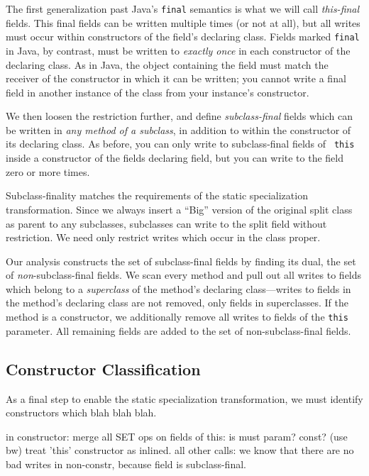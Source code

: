 \documentclass{acmconf}
\begin{document}
The first generalization past Java's {\tt final} semantics is what we
will call {\it this-final} fields.  This final fields can be written
multiple times (or not at all), but all writes must occur within
constructors of the field's declaring class.
Fields marked {\tt final} in Java, by
contrast, must be written to {\it exactly once} in each constructor of
the declaring class.
As in Java, the object containing the field must match the receiver of
the constructor in which it can be written; you cannot write a final
field in another instance of the class from your instance's
constructor.

We then loosen the restriction further, and define
{\it subclass-final} fields which can be written in {\it any method of
  a subclass}, in addition to within the constructor of its declaring
class.  As before, you can only write to subclass-final fields of {\tt
  this} inside a constructor of the fields declaring field, but you
can write to the field zero or more times.

Subclass-finality matches the requirements of the static
specialization transformation.  Since we always insert a ``Big''
version of the original split class as parent to any subclasses,
subclasses can write to the split field without restriction.
We need only restrict writes which occur in the class proper.

Our analysis constructs the set of subclass-final fields by finding
its dual, the set of {\it non}-subclass-final fields.  We scan every
method and pull out all writes to fields which belong to
a {\it superclass} of the method's declaring class---writes to fields
in the method's declaring class are not removed, only fields in
superclasses.  If the method is a constructor, we additionally remove
all writes to fields of the {\tt this} parameter.  All remaining
fields are added to the set of non-subclass-final fields.

\subsection{Constructor Classification}
As a final step to enable the static specialization transformation, we
must identify constructors which blah blah blah.

in constructor:
  merge all SET ops on fields of this: is must param?  const? (use bw)
  treat 'this' constructor as inlined.
  all other calls: we know that there are no bad writes in non-constr,
   because field is subclass-final.
\end{document}
